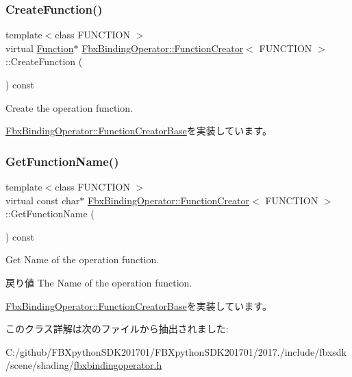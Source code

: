 \subsubsection{\texorpdfstring{Create\+Function()}{CreateFunction()}}
{\footnotesize\ttfamily template$<$class F\+U\+N\+C\+T\+I\+ON $>$ \\
virtual \hyperlink{class_fbx_binding_operator_1_1_function}{Function}$\ast$ \hyperlink{class_fbx_binding_operator_1_1_function_creator}{Fbx\+Binding\+Operator\+::\+Function\+Creator}$<$ F\+U\+N\+C\+T\+I\+ON $>$\+::Create\+Function (\begin{DoxyParamCaption}{ }\end{DoxyParamCaption}) const\hspace{0.3cm}{\ttfamily [virtual]}}

Create the operation function. 

\hyperlink{class_fbx_binding_operator_1_1_function_creator_base_a092cb78156b31c356d929c3cfa9ff077}{Fbx\+Binding\+Operator\+::\+Function\+Creator\+Base}を実装しています。

\mbox{\label{class_fbx_binding_operator_1_1_function_creator_ae54e4bf8030e91bcd1b6fe5e9126be9d}} 
\subsubsection{\texorpdfstring{Get\+Function\+Name()}{GetFunctionName()}}
{\footnotesize\ttfamily template$<$class F\+U\+N\+C\+T\+I\+ON $>$ \\
virtual const char$\ast$ \hyperlink{class_fbx_binding_operator_1_1_function_creator}{Fbx\+Binding\+Operator\+::\+Function\+Creator}$<$ F\+U\+N\+C\+T\+I\+ON $>$\+::Get\+Function\+Name (\begin{DoxyParamCaption}{ }\end{DoxyParamCaption}) const\hspace{0.3cm}{\ttfamily [virtual]}}

Get Name of the operation function. \begin{DoxyReturn}{戻り値}
The Name of the operation function. 
\end{DoxyReturn}


\hyperlink{class_fbx_binding_operator_1_1_function_creator_base_a7a5ec0f9c376ce88b12cbfe171498913}{Fbx\+Binding\+Operator\+::\+Function\+Creator\+Base}を実装しています。



このクラス詳解は次のファイルから抽出されました\+:\begin{DoxyCompactItemize}
\item 
C\+:/github/\+F\+B\+Xpython\+S\+D\+K201701/\+F\+B\+Xpython\+S\+D\+K201701/2017./include/fbxsdk/scene/shading/\hyperlink{fbxbindingoperator_8h}{fbxbindingoperator.\+h}\end{DoxyCompactItemize}
